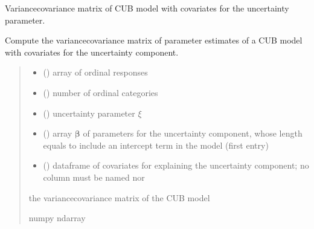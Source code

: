 \documentclass[letterpaper,10pt,english]{sphinxmanual}
\begin{document}

\begin{fulllineitems}
\label{\detokenize{cubmods:cubmods.cub_y0.varcov}}
\pysigstartsignatures
{}
\pysigstopsignatures
\sphinxAtStartPar
Variance\sphinxhyphen{}covariance matrix of CUB model with covariates for the uncertainty parameter.

\sphinxAtStartPar
Compute the variance\sphinxhyphen{}covariance matrix of parameter estimates of a CUB model with 
covariates for the uncertainty component.
\begin{quote}\begin{description}
\begin{itemize}
\item {} 
\sphinxAtStartPar
{} () \textendash{} array of ordinal responses

\item {} 
\sphinxAtStartPar
{} () \textendash{} number of ordinal categories

\item {} 
\sphinxAtStartPar
{} () \textendash{} uncertainty parameter \(\xi\)

\item {} 
\sphinxAtStartPar
{} () \textendash{} array \(\pmb \beta\) of parameters for the uncertainty component, whose length equals 
 to include an intercept term in the model (first entry)

\item {} 
\sphinxAtStartPar
{} () \textendash{} dataframe of covariates for explaining the uncertainty component;
no column must be named  nor 

\end{itemize}

\sphinxAtStartPar
the variance\sphinxhyphen{}covariance matrix of the CUB model

\sphinxAtStartPar
numpy ndarray

\end{description}\end{quote}

\end{fulllineitems}
\end{document}
